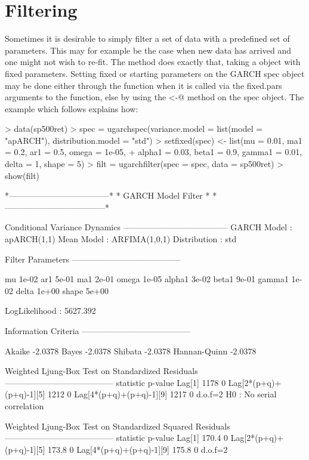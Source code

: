 \section{Filtering}\label{section:filtering}
Sometimes it is desirable to simply filter a set of data with a predefined set
of parameters. This may for example be the case when new data has arrived and
one might not wish to re-fit. The \verb@ugarchfilter@ method does exactly that,
taking a \verb@uGARCHspec@ object with fixed parameters. Setting fixed or
starting parameters on the GARCH spec object may be done either through the
\verb@ugarchspec@ function when it is called via the fixed.pars arguments to the
function, else by using the \verb@setfixed<-@ method on the spec object.
The example which follows explains how:
\begin{Schunk}
\begin{Sinput}
> data(sp500ret)
> spec = ugarchspec(variance.model = list(model = "apARCH"), distribution.model = "std")
> setfixed(spec) <- list(mu = 0.01, ma1 = 0.2, ar1 = 0.5, omega = 1e-05,
+     alpha1 = 0.03, beta1 = 0.9, gamma1 = 0.01, delta = 1, shape = 5)
> filt = ugarchfilter(spec = spec, data = sp500ret)
> show(filt)
\end{Sinput}
\begin{Soutput}
*------------------------------------*
*          GARCH Model Filter        *
*------------------------------------*

Conditional Variance Dynamics
--------------------------------------
GARCH Model	: apARCH(1,1)
Mean Model	: ARFIMA(1,0,1)
Distribution	: std

Filter Parameters
---------------------------------------

mu     1e-02
ar1    5e-01
ma1    2e-01
omega  1e-05
alpha1 3e-02
beta1  9e-01
gamma1 1e-02
delta  1e+00
shape  5e+00

LogLikelihood : 5627.392

Information Criteria
---------------------------------------

Akaike       -2.0378
Bayes        -2.0378
Shibata      -2.0378
Hannan-Quinn -2.0378

Weighted Ljung-Box Test on Standardized Residuals
---------------------------------------
                        statistic p-value
Lag[1]                       1178       0
Lag[2*(p+q)+(p+q)-1][5]      1212       0
Lag[4*(p+q)+(p+q)-1][9]      1217       0
d.o.f=2
H0 : No serial correlation

Weighted Ljung-Box Test on Standardized Squared Residuals
---------------------------------------
                        statistic p-value
Lag[1]                      170.4       0
Lag[2*(p+q)+(p+q)-1][5]     173.8       0
Lag[4*(p+q)+(p+q)-1][9]     175.8       0
d.o.f=2


\end{Soutput}
\end{Schunk}

